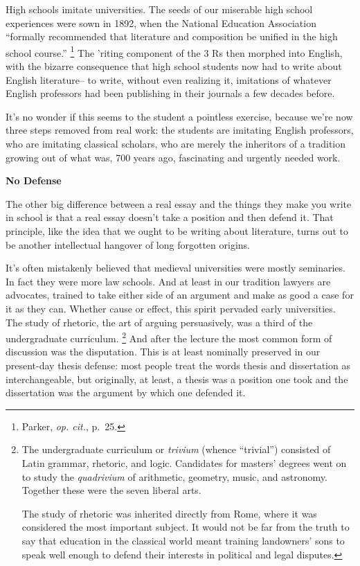 \documentclass[12pt]{book}
\begin{document}
High schools imitate universities. The seeds of our miserable high
school experiences were sown in 1892, when the National Education
Association ``formally recommended that literature and composition be
unified in the high school course.'' \footnote{Parker, \emph{op. cit.}, p.~25.} The 'riting component of
the 3 Rs then morphed into English, with the bizarre consequence that
high school students now had to write about English literature-- to
write, without even realizing it, imitations of whatever English
professors had been publishing in their journals a few decades before.

It's no wonder if this seems to the student a pointless exercise,
because we're now three steps removed from real work: the students are
imitating English professors, who are imitating classical scholars, who
are merely the inheritors of a tradition growing out of what was, 700
years ago, fascinating and urgently needed work.

\textbf{No Defense}

The other big difference between a real essay and the things they make
you write in school is that a real essay doesn't take a position and
then defend it. That principle, like the idea that we ought to be
writing about literature, turns out to be another intellectual hangover
of long forgotten origins.

It's often mistakenly believed that medieval universities were mostly
seminaries. In fact they were more law schools. And at least in our
tradition lawyers are advocates, trained to take either side of an
argument and make as good a case for it as they can. Whether cause or
effect, this spirit pervaded early universities. The study of rhetoric,
the art of arguing persuasively, was a third of the undergraduate
curriculum. \footnote{The undergraduate curriculum or \emph{trivium} (whence
``trivial'') consisted of Latin grammar, rhetoric, and logic. Candidates
for masters' degrees went on to study the \emph{quadrivium} of
arithmetic, geometry, music, and astronomy. Together these were the
seven liberal arts.

The study of rhetoric was inherited directly from Rome, where it was
considered the most important subject. It would not be far from the
truth to say that education in the classical world meant training
landowners' sons to speak well enough to defend their interests in
political and legal disputes.} And after the lecture the most common form of
discussion was the disputation. This is at least nominally preserved in
our present-day thesis defense: most people treat the words thesis and
dissertation as interchangeable, but originally, at least, a thesis was
a position one took and the dissertation was the argument by which one
defended it.
\end{document}
